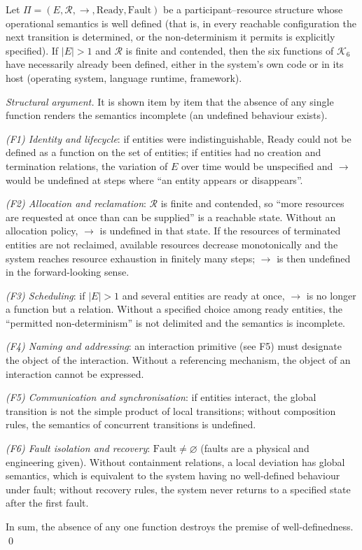 \begin{theorem}\label{th:six}
Let $\Pi = (E, \mathcal{R}, \to, \mathrm{Ready}, \mathrm{Fault})$ be a
participant--resource structure whose operational semantics is well defined (that is, in
every reachable configuration the next transition is determined, or the non-determinism it
permits is explicitly specified). If $|E| > 1$ and $\mathcal{R}$ is finite and contended,
then the six functions of $\mathcal{K}_6$ have necessarily already been defined, either in
the system's own code or in its host (operating system, language runtime, framework).
\end{theorem}

\begin{proof}[Structural argument]
It is shown item by item that the absence of any single function renders the semantics
incomplete (an undefined behaviour exists).

\emph{(F1) Identity and lifecycle}: if entities were indistinguishable, $\mathrm{Ready}$
could not be defined as a function on the set of entities; if entities had no creation and
termination relations, the variation of $E$ over time would be unspecified and $\to$ would
be undefined at steps where ``an entity appears or disappears''.

\emph{(F2) Allocation and reclamation}: $\mathcal{R}$ is finite and contended, so ``more
resources are requested at once than can be supplied'' is a reachable state. Without an
allocation policy, $\to$ is undefined in that state. If the resources of terminated entities
are not reclaimed, available resources decrease monotonically and the system reaches
resource exhaustion in finitely many steps; $\to$ is then undefined in the forward-looking
sense.

\emph{(F3) Scheduling}: if $|E| > 1$ and several entities are ready at once, $\to$ is no
longer a function but a relation. Without a specified choice among ready entities, the
``permitted non-determinism'' is not delimited and the semantics is incomplete.

\emph{(F4) Naming and addressing}: an interaction primitive (see F5) must designate the
object of the interaction. Without a referencing mechanism, the object of an interaction
cannot be expressed.

\emph{(F5) Communication and synchronisation}: if entities interact, the global transition
is not the simple product of local transitions; without composition rules, the semantics of
concurrent transitions is undefined.

\emph{(F6) Fault isolation and recovery}: $\mathrm{Fault} \ne \varnothing$ (faults are a
physical and engineering given). Without containment relations, a local deviation has global
semantics, which is equivalent to the system having no well-defined behaviour under fault;
without recovery rules, the system never returns to a specified state after the first fault.

In sum, the absence of any one function destroys the premise of well-definedness. \qed
\end{proof}

